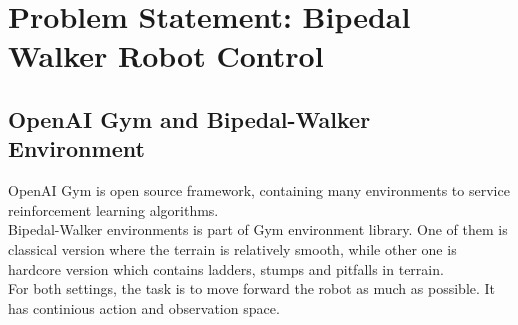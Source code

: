 \section{Problem Statement: Bipedal Walker Robot Control}
\label{sec:problem_statement}
\subsection{OpenAI Gym and Bipedal-Walker Environment}
\label{gym_bipedal}
OpenAI Gym \cite{brockman_openai_2016} is open source framework, containing many environments to service reinforcement learning algorithms. \\
Bipedal-Walker environments \cite{noauthor_bipedalwalker-v2_2021} \cite{noauthor_bipedalwalkerhardcore-v2_2021} is part of Gym environment library. One of them is classical version where the terrain is relatively smooth, while other one is hardcore version which contains ladders, stumps and pitfalls in terrain. \\
For both settings, the task is to move forward the robot as much as possible. It has continious action and observation space. \\
